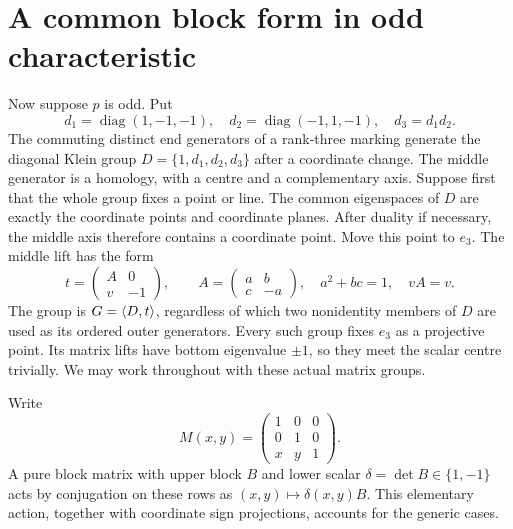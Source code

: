 \documentclass[11pt]{article}
\begin{document}
\section*{A common block form in odd characteristic}
Now suppose $p$ is odd. Put
\[
 d_1=\operatorname{diag}(1,-1,-1),\quad
 d_2=\operatorname{diag}(-1,1,-1),\quad d_3=d_1d_2.
\]
The commuting distinct end generators of a rank-three marking generate
the diagonal Klein group $D=\{1,d_1,d_2,d_3\}$ after a coordinate
change. The middle generator is a homology, with a centre and a
complementary axis. Suppose first that the whole group fixes a point
or line. The common eigenspaces of $D$ are exactly the coordinate
points and coordinate planes. After duality if necessary, the middle
axis therefore contains a coordinate point. Move this point to $e_3$.
The middle lift has the form
\[
 t=\begin{pmatrix}A&0\\v&-1\end{pmatrix},\qquad
 A=\begin{pmatrix}a&b\\c&-a\end{pmatrix},\quad
 a^2+bc=1,\quad vA=v.                                 \tag{1}
\]
The group is $G=\langle D,t\rangle$, regardless of which two nonidentity
members of $D$ are used as its ordered outer generators.
Every such group fixes $e_3$ as a projective point. Its matrix lifts
have bottom eigenvalue $\pm1$, so they meet the scalar centre trivially.
We may work throughout with these actual matrix groups.

Write
\[
 M(x,y)=\begin{pmatrix}1&0&0\\0&1&0\\x&y&1\end{pmatrix}.
\]
A pure block matrix with upper block $B$ and lower scalar
$\delta=\det B\in\{1,-1\}$ acts by conjugation on these rows as
$(x,y)\mapsto\delta(x,y)B$. This elementary action, together with
coordinate sign projections, accounts for the generic cases.
\end{document}
